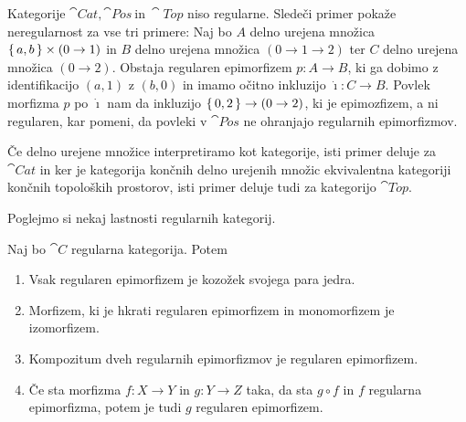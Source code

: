 \documentclass[../kategoricna_logika.tex]{subfiles}
\begin{document}
\begin{primer}
  Kategorije $\cat{Cat}, \cat{Pos}\ \text{in}\ \cat{Top}$ niso regularne.
  Sledeči primer pokaže neregularnost za vse tri primere:
  Naj bo $A$ delno urejena množica $\left\lbrace\,a, b\,\right\rbrace \times (0 \to 1)$ in $B$ delno urejena množica
  $(0 \to 1 \to 2)$ ter $C$ delno urejena množica $(0 \to 2)$.
  Obstaja regularen epimorfizem $p : A \to B$, ki ga dobimo z identifikacijo $(a,1)$ z $(b, 0)$
  in imamo očitno inkluzijo $\dot{\imath} : C \to B$. Povlek morfizma $p$ po $\dot{\imath}$ nam da inkluzijo
  $\left\lbrace\,0, 2\,\right\rbrace \to (0 \to 2)$, ki je epimozfizem, a ni regularen, kar pomeni,
  da povleki v $\cat{Pos}$ ne ohranjajo regularnih epimorfizmov.

  Če delno urejene množice interpretiramo kot kategorije, isti primer deluje za $\cat{Cat}$
  in ker je kategorija končnih delno urejenih množic ekvivalentna kategoriji končnih topoloških prostorov,
  isti primer deluje tudi za kategorijo $\cat{Top}$.
\end{primer}
Poglejmo si nekaj lastnosti regularnih kategorij.
\begin{lema}
    Naj bo $\cat{C}$ regularna kategorija. Potem
    \begin{enumerate}[label=(\roman*), nosep]
        \item Vsak regularen epimorfizem je kozožek svojega para jedra.
        \item Morfizem, ki je hkrati regularen epimorfizem in monomorfizem je izo\-morfizem.
        \item Kompozitum dveh regularnih epimorfizmov je regularen epimorfizem.
        \item Če sta morfizma $f : X \to Y$ in $g : Y \to Z$ taka,
          da sta $g \circ f$ in $f$ regularna epimorfizma, potem je tudi $g$ regularen epimorfizem.
    \end{enumerate}
\end{lema}
\noindent
\end{document}
